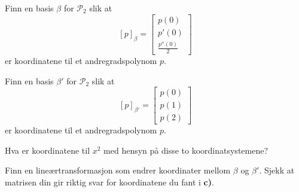 \begin{oppgave}
\begin{punkt}
Finn en basis $\beta$ for $\mathcal{P}_2$ slik at $$[p]_\beta=\begin{bmatrix}
p(0)\\
p'(0)\\
\frac{p''(0)}{2}
\end{bmatrix}$$
er koordinatene til et andregradspolynom $p$.
\end{punkt}

\begin{punkt}
Finn en basis $\beta '$ for $\mathcal{P}_2$ slik at $$[p]_{\beta '}=\begin{bmatrix}
p(0)\\
p(1)\\
p(2)
\end{bmatrix}$$
er koordinatene til et andregradspolynom $p$.
\end{punkt}

\begin{punkt}
Hva er koordinatene til $x^2$ med hensyn på disse to koordinatsystemene? 
\end{punkt}

\begin{punkt}
Finn en lineærtransformasjon som endrer koordinater mellom $\beta$ og $\beta '$. Sjekk at matrisen din gir riktig svar for koordinatene du fant i \textbf{c)}.
\end{punkt}

\end{oppgave}

